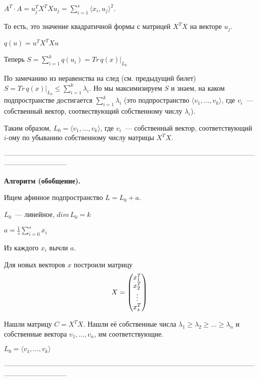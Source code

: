 $A^T\cdot A = u_j^TX^TXu_j = \sum\limits_{i = 1}^s\langle x_i, u_j\rangle^2$.

То есть, это значение квадратичной формы с матрицей $X^TX$ на векторе $u_j$.

$q(u) = u^TX^TXu$

Теперь $S = \sum\limits_{i = 1}^k q(u_i) = Tr\, q(x)|_{L_0}$

По замечанию из неравенства на след (см. предыдущий билет) $S = Tr\,q(x)|_{L_0} \le \sum\limits_{i = 1}^k \lambda_i$. Но мы максимизируем $S$ и знаем, на каком подпространстве достигается $\sum\limits_{i = 1}^k \lambda_i$ (это подпространство $\langle v_1,\ldots, v_k\rangle$, где $v_i$~--- собственный вектор, соотвествующий собственному числу $\lambda_i$).

Таким образом, $L_0 = \langle v_1,\ldots,v_k\rangle$, где $v_i$~--- собственный вектор, соответствующий $i$-ому по убыванию собственному числу матрицы $X^TX$.

---------------------------------------------------------------------------------------------------------------------------------------

{\bf Алгоритм (обобщение).}

Ищем афинное подпространство $L = L_0 + a$.

$L_0$~--- линейное, $dim\,L_0 = k$

$a = \frac{1}{s}\sum\limits_{i = 0}^s x_i$

Из каждого $x_i$ вычли $a$.

Для новых векторов $x$ построили матрицу 
$$
X=\begin{pmatrix}
x_1^T\\
x_2^T\\
\vdots\\
x_s^T
\end{pmatrix}
$$

Нашли матрицу $C = X^TX$. Нашли её собственные числа $\lambda_1\ge\lambda_2\ge\ldots\ge\lambda_n$ и собственные вектора $v_1,\ldots, v_n$, им соответствующие.

$L_0 = \langle v_1,\ldots,v_k\rangle$

---------------------------------------------------------------------------------------------------------------------------------------